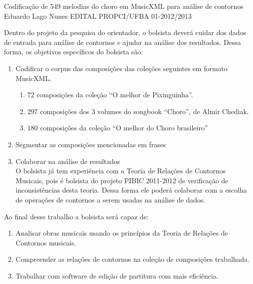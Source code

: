 \documentclass[11pt]{article}
\begin{document}

\dadosBolsista
{Codificação de 549 melodias do choro em MusicXML para análise de
  contornos}
{Eduardo Lago Nunes}
{EDITAL PROPCI/UFBA 01-2012/2013}

\newpage


Dentro do projeto da pesquisa do orientador, o bolsista deverá cuidar
dos dados de entrada para análise de contornos e ajudar na análise dos
resultados. Dessa forma, os objetivos específicos do bolsista são:

\begin{enumerate}
\item Codificar o corpus das composições das coleções seguintes em
  formato MusicXML.
  \begin{enumerate}
  \item 72 composições da coleção ``O melhor de Pixinguinha''.
  \item 297 composições dos 3 volumes do songbook ``Choro'', de Almir
    Chediak.
  \item 180 composições da coleção ``O melhor do Choro brasileiro''
  \end{enumerate}
\item Segmentar as composições mencionadas em frases
\item Colaborar na análise de resultados\\ O bolsista já tem
  experiência com a Teoria de Relações de Contornos Musicais, pois é
  bolsista do projeto PIBIC 2011-2012 de verificação de
  inconsistências desta teoria. Dessa forma ele poderá colaborar com a
  escolha de operações de contornos a serem usadas na análise de
  dados.
\end{enumerate}


Ao final desse trabalho a bolsista será capaz de:
\begin{enumerate}
\item Analisar obras musicais usando os princípios da Teoria de
  Relações de Contornos musicais.
\item Compreender as relações de contornos na coleção de composições
  trabalhada.
\item Trabalhar com software de edição de partitura com mais
  eficiência.
\end{enumerate}

\end{document}
